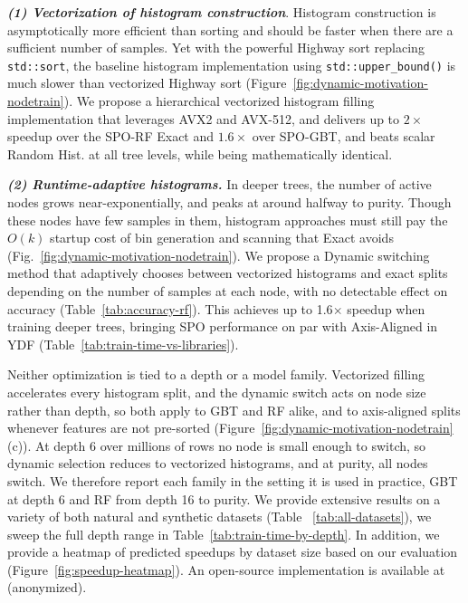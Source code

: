\documentclass[sigconf,anonymous,review]{acmart}
\begin{document}
\emph{\textbf{(1) Vectorization of histogram construction}}. Histogram construction is asymptotically more efficient than sorting and should be faster when there are a sufficient number of samples. Yet with the powerful Highway sort replacing \texttt{std::sort}, the baseline histogram implementation using \texttt{std::upper\_bound()} is much slower than vectorized Highway sort (Figure~\ref{fig:dynamic-motivation-nodetrain}). We propose a hierarchical vectorized histogram filling implementation that leverages AVX2 and AVX-512, and delivers up to $2\times$ speedup over the SPO-RF Exact and $1.6\times$ over SPO-GBT, and beats scalar Random Hist. at all tree levels, while being mathematically identical.

\emph{\textbf{(2) Runtime-adaptive histograms.}} In deeper trees, the number of active nodes grows near-exponentially, and peaks at around halfway to purity. Though these nodes have few samples in them, histogram approaches must still pay the $O(k)$ startup cost of bin generation and scanning that Exact avoids (Fig.~\ref{fig:dynamic-motivation-nodetrain}). We propose a Dynamic switching method that adaptively chooses between vectorized histograms and exact splits depending on the number of samples at each node, with no detectable effect on accuracy (Table~\ref{tab:accuracy-rf}). This achieves up to 1.6$\times$ speedup when training deeper trees, bringing SPO performance on par with Axis-Aligned in YDF (Table~\ref{tab:train-time-vs-libraries}).

Neither optimization is tied to a depth or a model family. Vectorized filling accelerates every histogram split, and the dynamic switch acts on node size rather than depth, so both apply to GBT and RF alike, and to axis-aligned splits whenever features are not pre-sorted (Figure~\ref{fig:dynamic-motivation-nodetrain}(c)). At depth 6 over millions of rows no node is small enough to switch, so dynamic selection reduces to vectorized histograms, and at purity, all nodes switch. We therefore report each family in the setting it is used in practice, GBT at depth 6 and RF from depth 16 to purity. We provide extensive results on a variety of both natural and synthetic datasets (Table ~\ref{tab:all-datasets}), we sweep the full depth range in Table~\ref{tab:train-time-by-depth}. In addition, we provide a heatmap of predicted speedups by dataset size based on our evaluation (Figure~\ref{fig:speedup-heatmap}). An open-source implementation is available at (anonymized).

\end{document}
